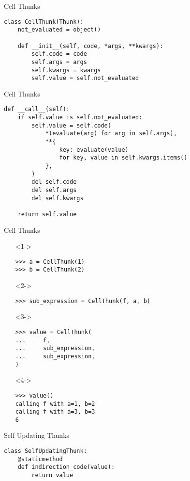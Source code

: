 \documentclass{beamer}
\begin{document}
\begin{frame}[fragile]{Cell Thunks}
  \begin{verbatim}
class CellThunk(Thunk):
    not_evaluated = object()

    def __init__(self, code, *args, **kwargs):
        self.code = code
        self.args = args
        self.kwargs = kwargs
        self.value = self.not_evaluated
  \end{verbatim}
\end{frame}

\begin{frame}[fragile]{Cell Thunks}
  \begin{verbatim}
def __call__(self):
    if self.value is self.not_evaluated:
        self.value = self.code(
            *(evaluate(arg) for arg in self.args),
            **{
                key: evaluate(value)
                for key, value in self.kwargs.items()
            },
        )
        del self.code
        del self.args
        del self.kwargs

    return self.value
  \end{verbatim}
\end{frame}

\begin{frame}[fragile]{Cell Thunks}
  \begin{itemize}
  \item[]<1-> \begin{verbatim}
>>> a = CellThunk(1)
>>> b = CellThunk(2)
    \end{verbatim}
  \item[]<2-> \begin{verbatim}
>>> sub_expression = CellThunk(f, a, b)
    \end{verbatim}
  \item[]<3-> \begin{verbatim}
>>> value = CellThunk(
...     f,
...     sub_expression,
...     sub_expression,
)
    \end{verbatim}
  \item[]<4-> \begin{verbatim}
>>> value()
calling f with a=1, b=2
calling f with a=3, b=3
6
    \end{verbatim}
  \end{itemize}
\end{frame}

\begin{frame}[fragile]{Self Updating Thunks}
  \begin{verbatim}
class SelfUpdatingThunk:
    @staticmethod
    def indirection_code(value):
        return value
  \end{verbatim}
\end{frame}
\end{document}
